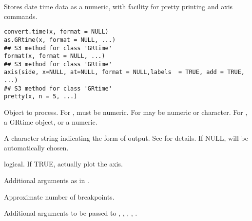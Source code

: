 \documentclass[a4paper]{book}
\begin{document}
%
\begin{Description}\relax
Stores date time data as a numeric, with facility for pretty printing and axis commands.
\end{Description}
%
\begin{Usage}
\begin{verbatim}
convert.time(x, format = NULL)
as.GRtime(x, format = NULL, ...)
## S3 method for class 'GRtime'
format(x, format = NULL, ...)
## S3 method for class 'GRtime'
axis(side, x=NULL, at=NULL, format = NULL,labels  = TRUE, add = TRUE,  ...)
## S3 method for class 'GRtime'
pretty(x, n = 5, ...)
\end{verbatim}
\end{Usage}
%
\begin{Arguments}
\begin{ldescription}
\item[\code{x}] Object to process. For , must be numeric. For  may be numeric or character. For , a GRtime object, or a numeric.
\item[\code{format}] A character string indicating the form of output. See  for details. If NULL, will be automatically chosen.
\item[\code{add}] logical. If TRUE, actually plot the axis.
\item[\code{at, side, labels}] Additional arguments as in .
\item[\code{n}] Approximate number of breakpoints.
\item[\code{...}] Additional arguments to be passed to , , , , . 
\end{ldescription}
\end{Arguments}
%
\end{document}

